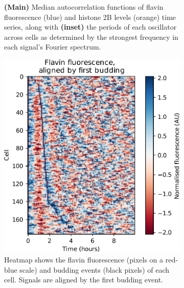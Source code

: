 \begin{figure}
\begin{subfigure}[htpb]{0.4\textwidth}
   \caption{
     \textbf{(Main)} Median autocorrelation functions of flavin fluorescence (blue) and histone 2B levels (orange) time series, %
     along with \textbf{(inset)} the periods of each oscillator across cells as determined by the strongest frequency in each signal's Fourier spectrum.
   }
   \label{fig:biology-highglc-sync-acf}
  \end{subfigure}

  \begin{subfigure}[htpb]{0.4\textwidth}
   \centering
   \includegraphics[width=\textwidth]{heatmap_edit.pdf}
   \caption{
     Heatmap shows the flavin fluorescence (pixels on a red-blue scale) and budding events (black pixels) of each cell.
     Signals are aligned by the first budding event.
   }
   \label{fig:biology-highglc-sync-heatmap}
  \end{subfigure}%
  \begin{subfigure}[htpb]{0.4\textwidth}
   \centering

\end{subfigure}
\end{figure}
